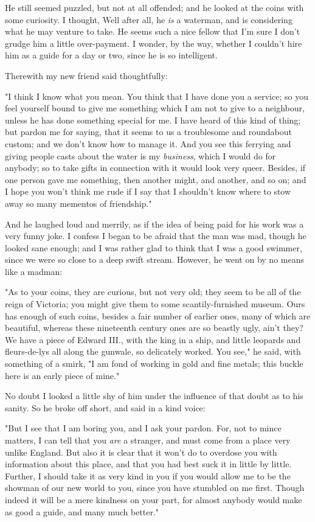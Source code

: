 He still seemed puzzled, but not at all offended; and he looked at the
coins with some curiosity. I thought, Well after all, he \emph{is} a
waterman, and is considering what he may venture to take. He seems such
a nice fellow that I'm sure I don't grudge him a little over-payment. I
wonder, by the way, whether I couldn't hire him as a guide for a day or
two, since he is so intelligent.

Therewith my new friend said thoughtfully:

"I think I know what you mean. You think that I have done you a service;
so you feel yourself bound to give me something which I am not to give
to a neighbour, unless he has done something special for me. I have
heard of this kind of thing; but pardon me for saying, that it seems to
us a troublesome and roundabout custom; and we don't know how to manage
it. And you see this ferrying and giving people casts about the water is
my \emph{business}, which I would do for anybody; so to take gifts in
connection with it would look very queer. Besides, if one person gave me
something, then another might, and another, and so on; and I hope you
won't think me rude if I say that I shouldn't know where to stow away so
many mementos of friendship."

And he laughed loud and merrily, as if the idea of being paid for his
work was a very funny joke. I confess I began to be afraid that the man
was mad, though he looked sane enough; and I was rather glad to think
that I was a good swimmer, since we were so close to a deep swift
stream. However, he went on by no means like a madman:

"As to your coins, they are curious, but not very old; they seem to be
all of the reign of Victoria; you might give them to some
scantily-furnished museum. Ours has enough of such coins, besides a fair
number of earlier ones, many of which are beautiful, whereas these
nineteenth century ones are so beastly ugly, ain't they? We have a piece
of Edward III., with the king in a ship, and little leopards and
fleurs-de-lys all along the gunwale, so delicately worked. You see," he
said, with something of a smirk, "I am fond of working in gold and fine
metals; this buckle here is an early piece of mine."

No doubt I looked a little shy of him under the influence of that doubt
as to his sanity. So he broke off short, and said in a kind voice:

"But I see that I am boring you, and I ask your pardon. For, not to
mince matters, I can tell that you \emph{are} a stranger, and must come
from a place very unlike England. But also it is clear that it won't do
to overdose you with information about this place, and that you had best
suck it in little by little. Further, I should take it as very kind in
you if you would allow me to be the showman of our new world to you,
since you have stumbled on me first. Though indeed it will be a mere
kindness on your part, for almost anybody would make as good a guide,
and many much better."

